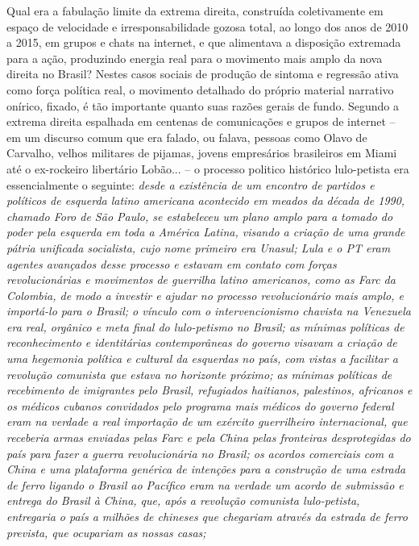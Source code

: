 Qual era a fabulação limite da extrema direita, construída coletivamente
em espaço de velocidade e irresponsabilidade gozosa total, ao longo dos
anos de 2010 a 2015, em grupos e chats na internet, e que alimentava a
disposição extremada para a ação, produzindo energia real para o
movimento mais amplo da nova direita no Brasil? Nestes casos sociais de
produção de sintoma e regressão ativa como força política real, o
movimento detalhado do próprio material narrativo onírico, fixado, é tão
importante quanto suas razões gerais de fundo. Segundo a extrema direita
espalhada em centenas de comunicações e grupos de internet -- em um
discurso comum que era falado, ou falava, pessoas como Olavo de
Carvalho, velhos militares de pijamas, jovens empresários brasileiros em
Miami até o ex-rockeiro libertário Lobão... -- o processo politico
histórico lulo-petista era essencialmente o seguinte: \emph{desde a
existência de um encontro de partidos e políticos de esquerda latino
americana acontecido em meados da década de 1990, chamado Foro de São
Paulo, se estabeleceu um plano amplo para a tomado do poder pela
esquerda em toda a América Latina, visando a criação de uma grande
pátria unificada socialista, cujo nome primeiro era Unasul; Lula e o PT
eram agentes avançados desse processo e estavam em contato com forças
revolucionárias e movimentos de guerrilha latino americanos, como as
Farc da Colombia, de modo a investir e ajudar no processo revolucionário
mais amplo, e importá-lo para o Brasil; o vínculo com o intervencionismo
chavista na Venezuela era real, orgânico e meta final do lulo-petismo no
Brasil; as mínimas políticas de reconhecimento e identitárias
contemporâneas do governo visavam a criação de uma hegemonia política e
cultural da esquerdas no país, com vistas a facilitar a revolução
comunista que estava no horizonte próximo; as mínimas políticas de
recebimento de imigrantes pelo Brasil, refugiados haitianos, palestinos,
africanos e os médicos cubanos convidados pelo programa mais médicos do
governo federal eram na verdade a real importação de um exército
guerrilheiro internacional, que receberia armas enviadas pelas Farc e
pela China pelas fronteiras desprotegidas do país para fazer a guerra
revolucionária no Brasil; os acordos comerciais com a China e uma
plataforma genérica de intenções para a construção de uma estrada de
ferro ligando o Brasil ao Pacífico eram na verdade um acordo de
submissão e entrega do Brasil à China, que, após a revolução comunista
lulo-petista, entregaria o país a milhões de chineses que chegariam
através da estrada de ferro prevista, que ocupariam as nossas casas;
}
